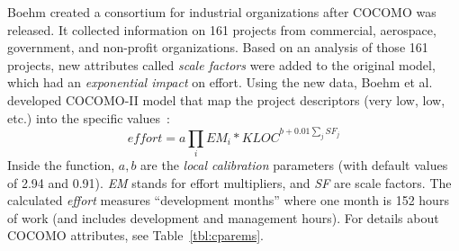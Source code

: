 \documentclass[sigconf,review,anonymous]{acmart}
\newcommand{\tbl}[1]{Table~\ref{tbl:#1}}
\newcommand{\fig}[1]{Figure~\ref{fig:#1}}
\begin{document}
  
    
    


Boehm created a consortium for
industrial organizations after COCOMO was released.
It collected information on 161 projects from commercial,
aerospace, government, and non-profit organizations.
Based on an analysis of those 161 projects, new attributes called {\em scale factors} were added to the original model, which had an {\em exponential impact}
on effort.
Using the new data, Boehm et al. developed COCOMO-II model that map the project descriptors (very low, low, etc.)
into the specific values~\cite{boehm2000cost}:
\[
\mathit{effort}=a\prod_i EM_i *\mathit{KLOC}^{b+0.01\sum_j SF_j}
\]
Inside the function, $a,b$ are the {\em local calibration} parameters (with default values of 2.94 and 0.91). {\em EM} stands for effort multipliers, and {\em SF} are scale factors. The calculated {\em effort}
measures ``development months'' where one month is 152 hours of work  (and includes development and management hours). For details about COCOMO attributes, see \tbl{cparems}.
\end{document}
